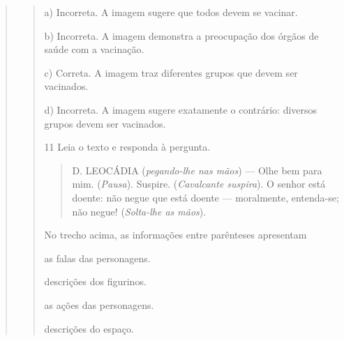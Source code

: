 \begin{escolha}
\begin{escolha}
\begin{escolha}
\begin{quote}
\begin{quote}
{{a) Incorreta. A imagem sugere que todos devem se vacinar.

b) Incorreta.  A imagem demonstra a preocupação dos órgãos de saúde
com a vacinação.

c) Correta. A imagem traz diferentes grupos que devem ser vacinados.

d) Incorreta. A imagem sugere exatamente o contrário: diversos grupos
devem ser vacinados.}

\num{11} Leia o texto e responda à pergunta.

\begin{quote}
D. LEOCÁDIA (\textit{pegando-lhe nas mãos}) --- Olhe bem para mim. 
(\textit{Pausa}). Suspire. (\textit{Cavalcante suspira}). O senhor está
doente: não negue que está doente --- moralmente, entenda-se; não negue!
(\textit{Solta-lhe as mãos}).
\end{quote}


No trecho acima, as informações entre parênteses apresentam

\begin{escolha}
  \item as falas das personagens.

  \item descrições dos figurinos.

  \item as ações das personagens.

  \item descrições do espaço.
\end{escolha}


}
\end{quote}
\end{quote}
\end{escolha}
\end{escolha}
\end{escolha}
